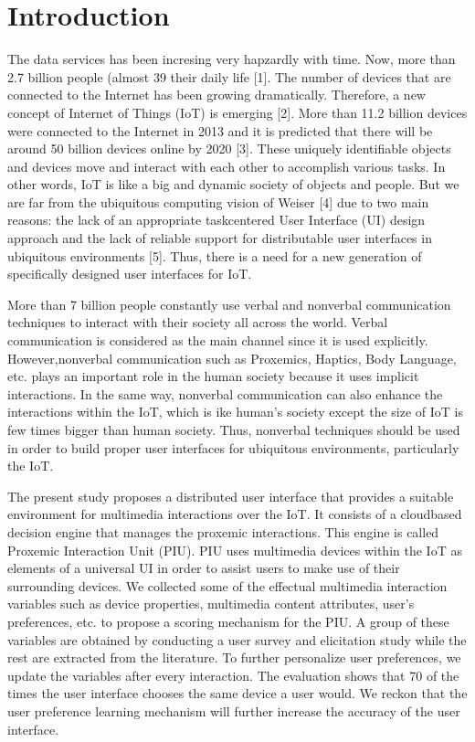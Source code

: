 \documentclass[runningheads,a4paper]{llncs}
\begin{document}
\section{Introduction}

The data services has been incresing very hapzardly with time. Now, more than 2.7
billion people (almost 39%
their daily life [1]. The number of devices that are connected to the Internet has
been growing dramatically. Therefore, a new concept of Internet of Things (IoT)
is emerging [2]. More than 11.2 billion devices were connected to the Internet in
2013 and it is predicted that there will be around 50 billion devices online by 2020
[3]. These uniquely identifiable objects and devices move and interact with each
other to accomplish various tasks. In other words, IoT is like a big and dynamic
society of objects and people. But we are far from the ubiquitous computing
vision of Weiser [4] due to two main reasons: the lack of an appropriate taskcentered User Interface (UI) design approach and the lack of reliable support
for distributable user interfaces in ubiquitous environments [5]. Thus, there is a
need for a new generation of specifically designed user interfaces for IoT.



More than 7 billion people constantly use verbal and nonverbal communication techniques to interact with their society all across the world. Verbal communication is considered as the main channel since it is used explicitly. However,nonverbal communication such as Proxemics, Haptics, Body Language, etc. plays
an important role in the human society because it uses implicit interactions. In
the same way, nonverbal communication can also enhance the interactions within
the IoT, which is ike human’s society except the size of IoT is few times bigger
than human society. Thus, nonverbal techniques should be used in order to build
proper user interfaces for ubiquitous environments, particularly the IoT.



The present study proposes a distributed user interface that provides a suitable environment for multimedia interactions over the IoT. It consists of a cloudbased decision engine that manages the proxemic interactions. This engine is
called Proxemic Interaction Unit (PIU). PIU uses multimedia devices within
the IoT as elements of a universal UI in order to assist users to make use of
their surrounding devices. We collected some of the effectual multimedia interaction variables such as device properties, multimedia content attributes, user’s
preferences, etc. to propose a scoring mechanism for the PIU. A group of these
variables are obtained by conducting a user survey and elicitation study while
the rest are extracted from the literature. To further personalize user preferences,
we update the variables after every interaction. The evaluation shows that 70%
of the times the user interface chooses the same device a user would. We reckon
that the user preference learning mechanism will further increase the accuracy
of the user interface.
\end{document}
